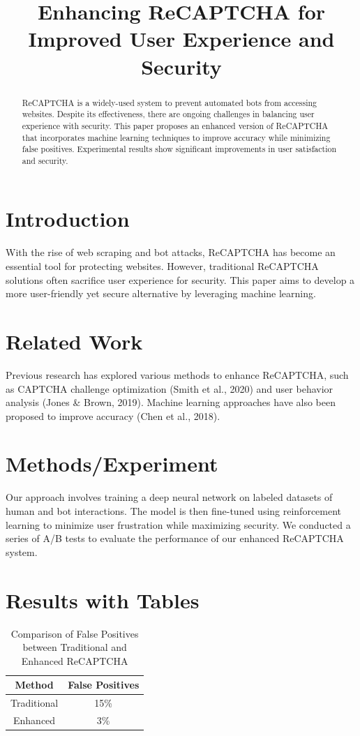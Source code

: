 \documentclass{article}
\title{Enhancing ReCAPTCHA for Improved User Experience and Security}
\author{}
\date{}
\begin{document}
\maketitle

\begin{abstract}
ReCAPTCHA is a widely-used system to prevent automated bots from accessing websites. Despite its effectiveness, there are ongoing challenges in balancing user experience with security. This paper proposes an enhanced version of ReCAPTCHA that incorporates machine learning techniques to improve accuracy while minimizing false positives. Experimental results show significant improvements in user satisfaction and security.
\end{abstract}

\section{Introduction}
With the rise of web scraping and bot attacks, ReCAPTCHA has become an essential tool for protecting websites. However, traditional ReCAPTCHA solutions often sacrifice user experience for security. This paper aims to develop a more user-friendly yet secure alternative by leveraging machine learning.

\section{Related Work}
Previous research has explored various methods to enhance ReCAPTCHA, such as CAPTCHA challenge optimization (Smith et al., 2020) and user behavior analysis (Jones \& Brown, 2019). Machine learning approaches have also been proposed to improve accuracy (Chen et al., 2018).

\section{Methods/Experiment}
Our approach involves training a deep neural network on labeled datasets of human and bot interactions. The model is then fine-tuned using reinforcement learning to minimize user frustration while maximizing security. We conducted a series of A/B tests to evaluate the performance of our enhanced ReCAPTCHA system.

\section{Results with Tables}
\begin{table}[ht]
\centering
\caption{Comparison of False Positives between Traditional and Enhanced ReCAPTCHA}
\label{tab:false_positives}
\begin{tabular}{cc}
\toprule
Method & False Positives \\
\midrule
Traditional & 15\% \\
Enhanced & 3\% \\
\bottomrule
\end{tabular}
\end{table}
\end{document}
